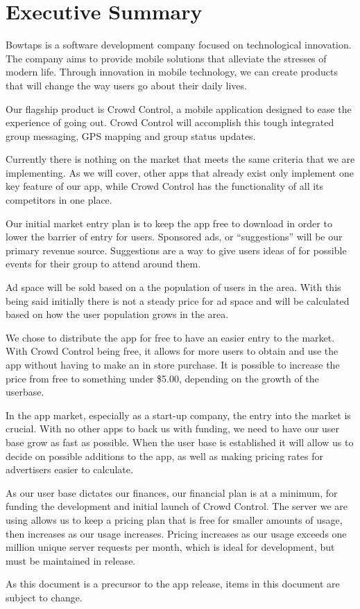 

\chapter{Executive Summary}


Bowtaps is a software development company focused on technological innovation. The company aims to provide mobile solutions that alleviate the stresses of modern life. Through innovation in mobile technology, we can create products that will change the way users go about their daily lives.

 Our flagship product is Crowd Control, a mobile application designed to ease the experience of going out. Crowd Control will accomplish this tough integrated group messaging, GPS mapping and group status updates.
 
Currently there is nothing on the market that meets the same criteria that we are implementing. As we will cover, other apps that already exist only implement one key feature of our app, while Crowd Control has the functionality of all its competitors in one place.
 
Our initial market entry plan is to keep the app free to download in order to lower the barrier of entry for users. Sponsored ads, or “suggestions” will be our primary revenue source. Suggestions are a way to give users ideas of for possible events for their group to attend around them.

Ad space will be sold based on a the population of users in the area. With this being said initially there is not a steady price for ad space and will be calculated based on how the user population grows in the area.

We chose to distribute the app for free to have an easier entry to the market. With Crowd Control being free, it allows for more users to obtain and use the app without having to make an in store purchase. It is possible to increase the price from free to something under \$5.00, depending on the growth of the userbase.

In the app market, especially as a start-up company, the entry into the market is crucial. With no other apps to back us with funding, we need to have our user base grow as fast as possible. When the user base is established it will allow us to decide on possible additions to the app, as well as making pricing rates for advertisers easier to calculate. 

As our user base dictates our finances, our financial plan is at a minimum, for funding the development and initial launch of Crowd Control. The server we are using allows us to keep a pricing plan that is free for smaller amounts of usage, then increases as our usage increases. Pricing increases as our usage exceeds one million unique server requests per month, which is ideal for development, but must be maintained in release.

As this document is a precursor to the app release, items in this document are subject to change.





